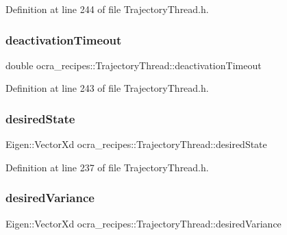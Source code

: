 Definition at line 244 of file Trajectory\+Thread.\+h.

\hypertarget{classocra__recipes_1_1TrajectoryThread_ab4de56a2b92a1887e4d046d7fa70d721}{}\label{classocra__recipes_1_1TrajectoryThread_ab4de56a2b92a1887e4d046d7fa70d721} 
\subsubsection{\texorpdfstring{deactivation\+Timeout}{deactivationTimeout}}
{\footnotesize\ttfamily double ocra\+\_\+recipes\+::\+Trajectory\+Thread\+::deactivation\+Timeout\hspace{0.3cm}{\ttfamily [protected]}}



Definition at line 243 of file Trajectory\+Thread.\+h.

\hypertarget{classocra__recipes_1_1TrajectoryThread_a2f90808ce72fd5a3a5d0b5d576860564}{}\label{classocra__recipes_1_1TrajectoryThread_a2f90808ce72fd5a3a5d0b5d576860564} 
\subsubsection{\texorpdfstring{desired\+State}{desiredState}}
{\footnotesize\ttfamily Eigen\+::\+Vector\+Xd ocra\+\_\+recipes\+::\+Trajectory\+Thread\+::desired\+State\hspace{0.3cm}{\ttfamily [protected]}}



Definition at line 237 of file Trajectory\+Thread.\+h.

\hypertarget{classocra__recipes_1_1TrajectoryThread_a86a09c83fbbf2b7a22469a3476204b24}{}\label{classocra__recipes_1_1TrajectoryThread_a86a09c83fbbf2b7a22469a3476204b24} 
\subsubsection{\texorpdfstring{desired\+Variance}{desiredVariance}}
{\footnotesize\ttfamily Eigen\+::\+Vector\+Xd ocra\+\_\+recipes\+::\+Trajectory\+Thread\+::desired\+Variance\hspace{0.3cm}{\ttfamily [protected]}}



